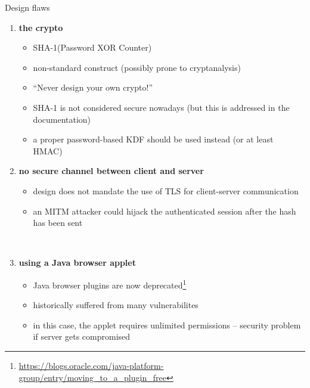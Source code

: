 \documentclass[12pt, t]{beamer}
\begin{document}
\begin{frame}[allowframebreaks]{Design flaws}
  \begin{enumerate}
    \item \textbf{the crypto}
      \begin{itemize}
        \item SHA-1(Password XOR Counter)
        \item non-standard construct (possibly prone to cryptanalysis)
        \item ``Never design your own crypto!''
        \item SHA-1 is not considered secure nowadays (but this is addressed in the documentation)
        \item a proper password-based KDF should be used instead (or at least HMAC)
      \end{itemize}
    \item \textbf{no secure channel between client and server}
      \begin{itemize}
        \item design does not mandate the use of TLS for client-server communication
        \item an MITM attacker could hijack the authenticated session after the hash has been sent
      \end{itemize}
      
      ~
    \item \textbf{using a Java browser applet}
      \begin{itemize}
        \item Java browser plugins are now deprecated\footnote{\url{https://blogs.oracle.com/java-platform-group/entry/moving_to_a_plugin_free}}
        \item historically suffered from many vulnerabilites
        \item in this case, the applet requires unlimited permissions -- security problem if server gets compromised
      \end{itemize}
  \end{enumerate}
\end{frame}
\end{document}
